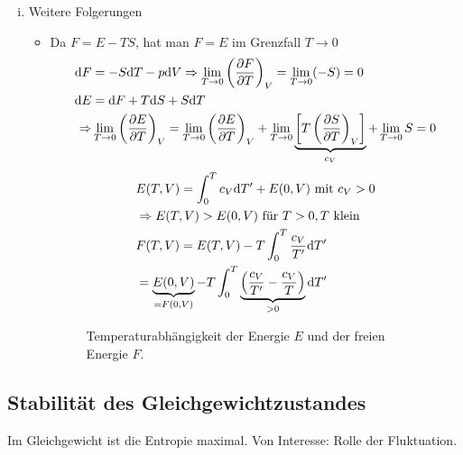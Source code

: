 \begin{enumerate}[i)]
    \item Weitere Folgerungen
    \begin{itemize}
        \item Da $F = E - TS$, hat man $F = E$ im Grenzfall $T \to 0$
        \begin{equation}
            \begin{split}
                \mathrm{d} F &= - S \mathrm{d} T - p \mathrm{d} V \Rightarrow \lim_{T \to 0} \left( \frac{\partial F}{\partial T} \right)_{V} = \lim_{T \to 0} (-S) = 0 \\
                \mathrm{d} E &= \mathrm{d} F + T \mathrm{d} S + S \mathrm{d} T \\
                \Rightarrow & \lim_{T \to 0} \left( \frac{\partial E}{\partial T} \right)_{V} = \lim_{T \to 0} \left( \frac{\partial E}{\partial T} \right)_{V}
                + \lim_{T \to 0} \underbrace{\left[ T \left( \frac{\partial S}{\partial T} \right)_{V} \right]}_{c_V} + \lim_{T \to 0} S = 0
            \end{split}
        \end{equation}
        \begin{equation}
            \begin{split}
                & E(T, V) = \int_{0}^{T} c_V \mathrm{d} T' + E(0, V) \text{ mit } c_V > 0 \\
                &\Rightarrow E(T, V) > E(0, V) \text{ für } T > 0, T \text{ klein} \\
                & F(T, V) = E(T, V) - T \int_{0}^{T} \frac{c_V}{T'} \mathrm{d} T' \\
                & = \underbrace{E(0, V)}_{=F(0, V)} - T \int_{0}^{T} \underbrace{\left( \frac{c_V}{T'} - \frac{c_V}{T} \right)}_{>0} \mathrm{d} T'
            \end{split}
        \end{equation}

\begin{figure}[H]
        \centering
        \def\svgwidth{0.5\textwidth}
        
        \caption{Temperaturabhängigkeit der Energie $E$ und der freien Energie $F$.}
        \label{img:FandEoverT}
\end{figure}

    \end{itemize}
\end{enumerate}



\subsection{Stabilität des Gleichgewichtzustandes}
Im Gleichgewicht ist die Entropie maximal. Von Interesse: Rolle der Fluktuation.

